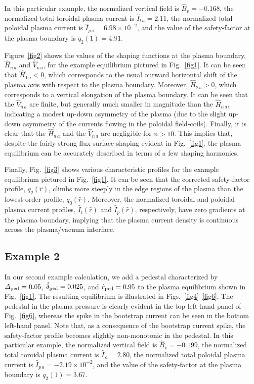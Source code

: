 \documentclass[12pt,prb,aps]{revtex4-1}
\begin{document}
 In this particular example, the
normalized vertical field is $\hat{B}_v = -0.168$, the normalized total toroidal plasma current is $\hat{I}_{t\,a}= 2.11$,  the normalized 
total poloidal plasma current is $\hat{I}_{p\,a}=6.98\times 10^{-2}$, and the value of the safety-factor  at the plasma boundary is $q_2(1)= 4.91$.

Figure~\ref{fig2} shows the values of the shaping functions at the plasma boundary, $\hat{H}_{n\,a}$ and $\hat{V}_{n\,a}$, for the 
example equilibrium pictured in Fig.~\ref{fig1}. It can be seen that $\hat{H}_{1\,a}<0$, which corresponds to the usual outward horizontal
shift of the plasma axis with respect to the plasma boundary. Moreover, $\hat{H}_{2\,a}>0$, which corresponds to a vertical elongation of the
plasma boundary. It can be seen that the $\hat{V}_{n\,a}$ are finite, but generally much smaller in magnitude than the $\hat{H}_{n\,a}$, indicating 
a modest up-down asymmetry of the plasma (due to the slight up-down asymmetry of the currents flowing in the poloidal
field-coils). Finally, it is clear  that the $\hat{H}_{n\,a}$ and the $\hat{V}_{n\,a}$ are negligible for $n>10$. This implies that, despite the
fairly strong flux-surface shaping evident in Fig.~\ref{fig1}, the plasma equilibrium can be accurately  described in terms of a few shaping harmonics. 

Finally, Fig.~\ref{fig3} shows various characteristic profiles for the example equilibrium pictured in Fig.~\ref{fig1}. It can be seen that the
corrected safety-factor profile, $q_2(\hat{r})$, climbs more steeply in the edge regions of the plasma than the lowest-order profile, 
$q_0(\hat{r})$. Moreover, the normalized toroidal and poloidal plasma current profiles, $\hat{I}_t(\hat{r})$ and $\hat{I}_p(\hat{r})$, respectively,
have zero gradients at the plasma boundary, implying that the plasma current density is continuous across the plasma/vacuum
interface. 

\subsection{Example 2}
In our second example calculation, we add a pedestal characterized by ${\mit\Delta}_{\rm ped} = 0.05$, $\hat{\delta}_{\rm ped}= 0.025$, and
$\hat{r}_{\rm ped}=0.95$ to the plasma equilibrium shown in Fig.~\ref{fig1}. The resulting equilibrium is illustrated in Figs.~\ref{fig4}--\ref{fig6}. 
The pedestal in the plasma pressure is clearly evident in the top left-hand panel of Fig.~\ref{fig6}, whereas the spike in the bootstrap
current can be seen in the bottom left-hand panel. Note that, as a consequence of the bootstrap current spike,  the safety-factor profile  becomes slightly non-monotonic in the pedestal. 
In this particular example, the
normalized vertical field is $\hat{B}_v = -0.199$, the normalized total toroidal plasma current is $\hat{I}_{\,a}= 2.80$,  the normalized 
total poloidal plasma current is $\hat{I}_{p\,a}=-2.19\times 10^{-2}$, and the value of the safety-factor  at the plasma boundary is $q_2(1)= 3.67$.
 
\end{document}
